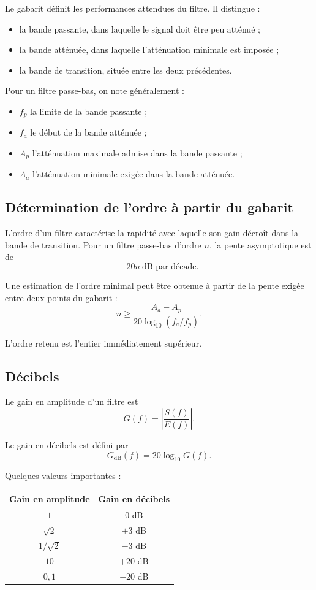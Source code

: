 Le gabarit définit les performances attendues du filtre. Il distingue :
\begin{itemize}
  \item la bande passante, dans laquelle le signal doit être peu atténué ;
  \item la bande atténuée, dans laquelle l'atténuation minimale est imposée ;
  \item la bande de transition, située entre les deux précédentes.
\end{itemize}

Pour un filtre passe-bas, on note généralement :
\begin{itemize}
  \item $f_p$ la limite de la bande passante ;
  \item $f_a$ le début de la bande atténuée ;
  \item $A_p$ l'atténuation maximale admise dans la bande passante ;
  \item $A_a$ l'atténuation minimale exigée dans la bande atténuée.
\end{itemize}

\subsection{Détermination de l'ordre à partir du gabarit}

L'ordre d'un filtre caractérise la rapidité avec laquelle son gain décroît dans la bande de transition. Pour un filtre passe-bas d'ordre $n$, la pente asymptotique est de
\[
-20n\ \text{dB par décade}.
\]

Une estimation de l'ordre minimal peut être obtenue à partir de la pente exigée entre deux points du gabarit :
\[
n\geq
\frac{A_a-A_p}{20\log_{10}(f_a/f_p)}.
\]

L'ordre retenu est l'entier immédiatement supérieur.

\subsection{Décibels}

Le gain en amplitude d'un filtre est
\[
G(f)=\left|\frac{S(f)}{E(f)}\right|.
\]

Le gain en décibels est défini par
\[
G_{\mathrm{dB}}(f)=20\log_{10}G(f).
\]

Quelques valeurs importantes :
\begin{center}
\begin{tabular}{cc}
\toprule
Gain en amplitude & Gain en décibels \\
\midrule
$1$ & $0$ dB \\
$\sqrt{2}$ & $+3$ dB \\
$1/\sqrt{2}$ & $-3$ dB \\
$10$ & $+20$ dB \\
$0{,}1$ & $-20$ dB \\
\bottomrule
\end{tabular}
\end{center}

